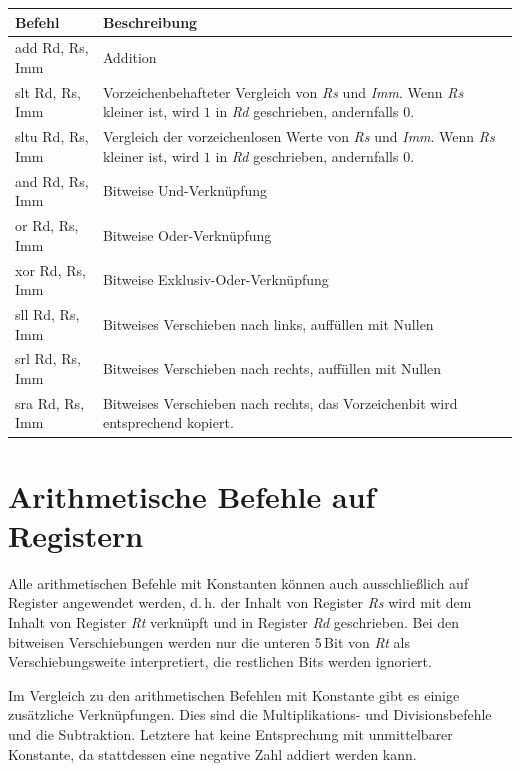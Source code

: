 \documentclass[a4paper,11pt]{article}
\begin{document}
	\begin{center}
		\begin{tabular}{>{\ttfamily}lp{11cm}}
			\toprule
			\normalfont\textbf{Befehl} & \textbf{Beschreibung} \\
			\midrule
			add Rd, Rs, Imm & Addition \\
			slt Rd, Rs, Imm & Vorzeichenbehafteter Vergleich von \textit{Rs} und \textit{Imm}.
								Wenn \textit{Rs} kleiner ist, wird $1$ in \textit{Rd} geschrieben, andernfalls $0$. \\
			sltu Rd, Rs, Imm & Vergleich der vorzeichenlosen Werte von \textit{Rs} und \textit{Imm}.
								Wenn \textit{Rs} kleiner ist, wird $1$ in \textit{Rd} geschrieben, andernfalls $0$. \\
			and Rd, Rs, Imm & Bitweise Und-Verknüpfung \\
			or  Rd, Rs, Imm & Bitweise Oder-Verknüpfung \\
			xor Rd, Rs, Imm & Bitweise Exklusiv-Oder-Verknüpfung \\
			sll Rd, Rs, Imm & Bitweises Verschieben nach links, auffüllen mit Nullen \\
			srl Rd, Rs, Imm & Bitweises Verschieben nach rechts, auffüllen mit Nullen \\
			sra Rd, Rs, Imm & Bitweises Verschieben nach rechts, das Vorzeichenbit wird entsprechend kopiert. \\
			\bottomrule
		\end{tabular}
	\end{center}
	
	\section{Arithmetische Befehle auf Registern}
	
	Alle arithmetischen Befehle mit Konstanten können auch ausschließlich auf Register angewendet werden, d.\,h. der Inhalt von Register \textit{Rs} wird mit dem Inhalt von Register \textit{Rt} verknüpft und in Register \textit{Rd} geschrieben.
	Bei den bitweisen Verschiebungen werden nur die unteren 5\,Bit von \textit{Rt} als Verschiebungsweite interpretiert, die restlichen Bits werden ignoriert.
	
	Im Vergleich zu den arithmetischen Befehlen mit Konstante gibt es einige zusätzliche Verknüpfungen.
	Dies sind die Multiplikations- und Divisionsbefehle und die Subtraktion.
	Letztere hat keine Entsprechung mit unmittelbarer Konstante, da stattdessen eine negative Zahl addiert werden kann.
	
\end{document}
